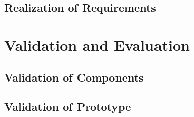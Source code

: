 	
	
	
	
	\subsection{Realization of Requirements}
	\label{subsec:realizationofrequirements}
	
	\section{Validation and Evaluation}
	\label{sec:evaluation}
	
	\subsection{Validation of Components}
	\label{subsec:validationofcomponents}
	
	
	
	
	\subsection{Validation of Prototype}
	\label{subsec:validationofprototype}
	
	



